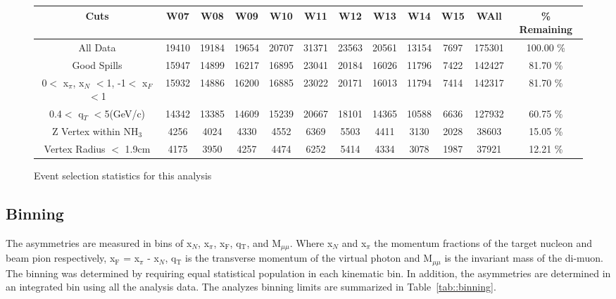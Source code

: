 \begin{figure}[h!t]
  \begin{adjustwidth}{-2cm}{}
    \begin{tabular}{ |c|c|c|c|c|c|c|c|c|c|c|c| }
      \hline \textbf{Cuts}& \textbf{W07}& \textbf{W08}& \textbf{W09}&
      \textbf{W10}& \textbf{W11}& \textbf{W12}& \textbf{W13}& \textbf{W14}&
      \textbf{W15} & \textbf{WAll} & \textbf{\% Remaining} \\ \hline

      All Data& 19410& 19184& 19654& 20707& 31371& 23563& 20561& 13154& 7697&
      175301& 100.00 \% \\ \hline
      
      Good Spills& 15947& 14899& 16217& 16895& 23041& 20184& 16026& 11796& 7422&
      142427& 81.70 \% \\ \hline

      0$<$ x$_{\pi}$, x$_N$ $<$1, -1$<$ x$_F$ $<$1& 15932& 14886& 16200& 16885&
      23022& 20171& 16013& 11794& 7414& 142317& 81.70 \% \\ \hline

      0.4$<$ q$_T$ $<$5(GeV/c)& 14342& 13385& 14609& 15239& 20667& 18101& 14365&
      10588& 6636& 127932& 60.75 \% \\ \hline

      Z Vertex within NH$_3$& 4256& 4024& 4330& 4552& 6369& 5503& 4411& 3130&
      2028& 38603& 15.05 \% \\ \hline

      Vertex Radius $<$ 1.9cm& 4175& 3950& 4257& 4474& 6252& 5414& 4334& 3078&
      1987& 37921& 12.21 \% \\ \hline
      
    \end{tabular}
    \caption{Event selection statistics for this analysis}
    \label{tab::EventTable}
  \end{adjustwidth}
\end{figure}

\subsection{Binning}
The asymmetries are measured in bins of x$_N$, x$_{\pi}$, x$_{\mathrm{F}}$,
q$_{\mathrm{T}}$, and M$_{\mu\mu}$.  Where x$_N$ and x$_{\pi}$ the momentum
fractions of the target nucleon and beam pion respectively, x$_{\mathrm{F}}$ =
x$_{\pi}$ - x$_N$, q$_{\mathrm{T}}$ is the transverse momentum of the virtual
photon and M$_{\mu\mu}$ is the invariant mass of the di-muon.  The binning was
determined by requiring equal statistical population in each kinematic bin.  In
addition, the asymmetries are determined in an integrated bin using all the
analysis data.  The analyzes binning limits are summarized in
Table~\ref{tab::binning}.

